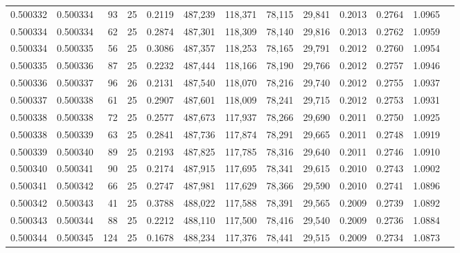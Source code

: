 \begin{tabular}{rrrrrrrrrrrrr}
0.500332 & 0.500334 &  93 &  25 &                                     0.2119 & 487,239 & 118,371 &  78,115 &  29,841 & 0.2013 & 0.2764 & 1.0965 \\
0.500334 & 0.500334 &  62 &  25 &                                     0.2874 & 487,301 & 118,309 &  78,140 &  29,816 & 0.2013 & 0.2762 & 1.0959 \\
0.500334 & 0.500335 &  56 &  25 &                                     0.3086 & 487,357 & 118,253 &  78,165 &  29,791 & 0.2012 & 0.2760 & 1.0954 \\
0.500335 & 0.500336 &  87 &  25 &                                     0.2232 & 487,444 & 118,166 &  78,190 &  29,766 & 0.2012 & 0.2757 & 1.0946 \\
0.500336 & 0.500337 &  96 &  26 &                                     0.2131 & 487,540 & 118,070 &  78,216 &  29,740 & 0.2012 & 0.2755 & 1.0937 \\
0.500337 & 0.500338 &  61 &  25 &                                     0.2907 & 487,601 & 118,009 &  78,241 &  29,715 & 0.2012 & 0.2753 & 1.0931 \\
0.500338 & 0.500338 &  72 &  25 &                                     0.2577 & 487,673 & 117,937 &  78,266 &  29,690 & 0.2011 & 0.2750 & 1.0925 \\
0.500338 & 0.500339 &  63 &  25 &                                     0.2841 & 487,736 & 117,874 &  78,291 &  29,665 & 0.2011 & 0.2748 & 1.0919 \\
0.500339 & 0.500340 &  89 &  25 &                                     0.2193 & 487,825 & 117,785 &  78,316 &  29,640 & 0.2011 & 0.2746 & 1.0910 \\
0.500340 & 0.500341 &  90 &  25 &                                     0.2174 & 487,915 & 117,695 &  78,341 &  29,615 & 0.2010 & 0.2743 & 1.0902 \\
0.500341 & 0.500342 &  66 &  25 &                                     0.2747 & 487,981 & 117,629 &  78,366 &  29,590 & 0.2010 & 0.2741 & 1.0896 \\
0.500342 & 0.500343 &  41 &  25 &                                     0.3788 & 488,022 & 117,588 &  78,391 &  29,565 & 0.2009 & 0.2739 & 1.0892 \\
0.500343 & 0.500344 &  88 &  25 &                                     0.2212 & 488,110 & 117,500 &  78,416 &  29,540 & 0.2009 & 0.2736 & 1.0884 \\
0.500344 & 0.500345 & 124 &  25 &                                     0.1678 & 488,234 & 117,376 &  78,441 &  29,515 & 0.2009 & 0.2734 & 1.0873 \\

\end{tabular}
